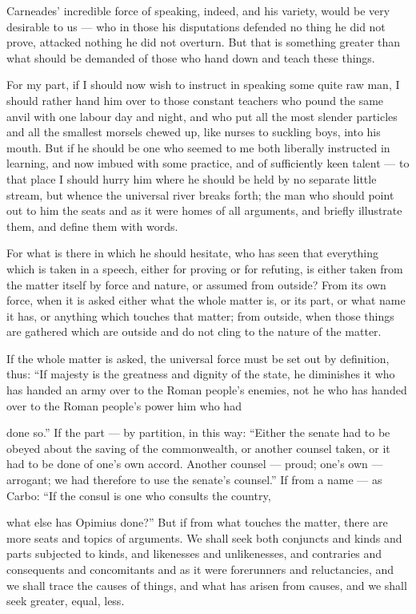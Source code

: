  Carneades' incredible force of speaking, indeed, and his variety, would be very desirable to us — who in those his disputations defended no thing he did not prove, attacked nothing he did not overturn. But that is something greater than what should be demanded of those who hand down and teach these things.

 For my part, if I should now wish to instruct in speaking some quite raw man, I should rather hand him over to those constant teachers who pound the same anvil with one labour day and night, and who put all the most slender particles and all the smallest morsels chewed up, like nurses to suckling boys, into his mouth. But if he should be one who seemed to me both liberally instructed in learning, and now imbued with some practice, and of sufficiently keen talent — to that place I should hurry him where he should be held by no separate little stream, but whence the universal river breaks forth; the man who should point out to him the seats and as it were homes of all arguments, and briefly illustrate them, and define them with words.

 For what is there in which he should hesitate, who has seen that everything which is taken in a speech, either for proving or for refuting, is either taken from the matter itself by force and nature, or assumed from outside? From its own force, when it is asked either what the whole matter is, or its part, or what name it has, or anything which touches that matter; from outside, when those things are gathered which are outside and do not cling to the nature of the matter.

 If the whole matter is asked, the universal force must be set out by definition, thus: ``If majesty is the greatness and dignity of the state, he diminishes it who has handed an army over to the Roman people's enemies, not he who has handed over to the Roman people's power him who had

 done so.'' If the part — by partition, in this way: ``Either the senate had to be obeyed about the saving of the commonwealth, or another counsel taken, or it had to be done of one's own accord. Another counsel — proud; one's own — arrogant; we had therefore to use the senate's counsel.'' If from a name — as Carbo: ``If the consul is one who consults the country,

 what else has Opimius done?'' But if from what touches the matter, there are more seats and topics of arguments. We shall seek both conjuncts and kinds and parts subjected to kinds, and likenesses and unlikenesses, and contraries and consequents and concomitants and as it were forerunners and reluctancies, and we shall trace the causes of things, and what has arisen from causes, and we shall seek greater, equal, less.


